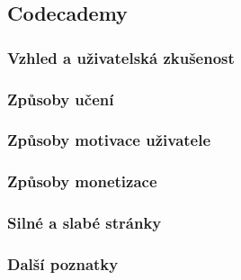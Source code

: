 \subsection{Codecademy}


\subsubsection{Vzhled a uživatelská zkušenost}









 

\subsubsection{Způsoby učení}






\subsubsection{Způsoby motivace uživatele}



\subsubsection{Způsoby monetizace}






\subsubsection{Silné a slabé stránky}





\subsubsection{Další poznatky}




